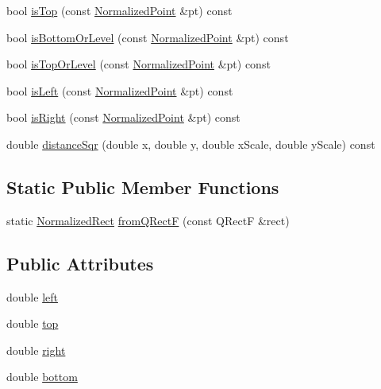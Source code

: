 \begin{DoxyCompactItemize}
\item 
bool \hyperlink{classOkular_1_1NormalizedRect_a415ad207e347970f0406989dfcbf1b1b}{is\+Top} (const \hyperlink{classOkular_1_1NormalizedPoint}{Normalized\+Point} \&pt) const 
\item 
bool \hyperlink{classOkular_1_1NormalizedRect_a97cba414c1e1e096ddeb9e93ad1fe86d}{is\+Bottom\+Or\+Level} (const \hyperlink{classOkular_1_1NormalizedPoint}{Normalized\+Point} \&pt) const 
\item 
bool \hyperlink{classOkular_1_1NormalizedRect_a0d525438d22d8b2ec76d054e1921b4e1}{is\+Top\+Or\+Level} (const \hyperlink{classOkular_1_1NormalizedPoint}{Normalized\+Point} \&pt) const 
\item 
bool \hyperlink{classOkular_1_1NormalizedRect_a8024acae1abfdb0765bd205df7efbfe3}{is\+Left} (const \hyperlink{classOkular_1_1NormalizedPoint}{Normalized\+Point} \&pt) const 
\item 
bool \hyperlink{classOkular_1_1NormalizedRect_ad42d751d8a6db695622645a1e1df8962}{is\+Right} (const \hyperlink{classOkular_1_1NormalizedPoint}{Normalized\+Point} \&pt) const 
\item 
double \hyperlink{classOkular_1_1NormalizedRect_a36a7a927756beabec76ab921da8ed108}{distance\+Sqr} (double x, double y, double x\+Scale, double y\+Scale) const 
\end{DoxyCompactItemize}
\subsection*{Static Public Member Functions}
\begin{DoxyCompactItemize}
\item 
static \hyperlink{classOkular_1_1NormalizedRect}{Normalized\+Rect} \hyperlink{classOkular_1_1NormalizedRect_a8e32af446abd7dbd07ae285a2ee4faa6}{from\+Q\+Rect\+F} (const Q\+Rect\+F \&rect)
\end{DoxyCompactItemize}
\subsection*{Public Attributes}
\begin{DoxyCompactItemize}
\item 
double \hyperlink{classOkular_1_1NormalizedRect_a76336fe9d733f2b559cf8df3ef48f9e7}{left}
\item 
double \hyperlink{classOkular_1_1NormalizedRect_acfb70f6417c993508d50090b512cb954}{top}
\item 
double \hyperlink{classOkular_1_1NormalizedRect_a12bbdbb865e6282c9a325b61638553f4}{right}
\item 
double \hyperlink{classOkular_1_1NormalizedRect_a06fddfff238371f6f584360c0678741a}{bottom}
\end{DoxyCompactItemize}


